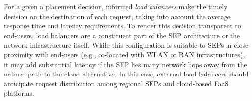 
%


For a given a placement decision, informed \textit{load balancers} make the timely decision on the destination of each request, taking into account the average response time and latency requirements. 
To render this decision transparent to end-users, 
load balancers are a constituent part of the SEP architecture or the network infrastructure itself. 
While this configuration is suitable to SEPs in close proximity with end-users (e.g., co-located with WLAN or RAN infrastructures), it may add substantial latency if the SEP lies many network hops away from the natural path to the cloud alternative. In this case, external load balancers should anticipate request distribution among regional SEPs and cloud-based FaaS platforms.














